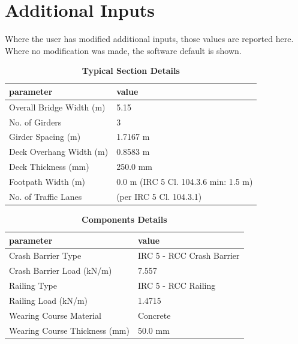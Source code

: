 \documentclass[12pt,a4paper]{report}
\numberwithin{table}{chapter}
\numberwithin{figure}{chapter}
\begin{document}
\newpage
\section{Additional Inputs}
\label{sec:additional-inputs}

Where the user has modified additional inputs, those values are reported here. Where no modification was made, the software default is shown.

\vspace{0.8cm}

\begin{longtable}{|L{5.5cm}|p{10.0cm}|}
\caption{\textbf{Typical Section Details}}
\hline
\textbf{parameter} & \textbf{value} \\
\hline
\textnormal{Overall Bridge Width (m)} & 5.15 \\[6pt]
\hline
\textnormal{No. of Girders} & 3 \\[6pt]
\hline
\textnormal{Girder Spacing (m)} & 1.7167 m \\[6pt]
\hline
\textnormal{Deck Overhang Width (m)} & 0.8583 m \\[6pt]
\hline
\textnormal{Deck Thickness (mm)} & 250.0 mm \\[6pt]
\hline
\textnormal{Footpath Width (m)} & 0.0 m (IRC 5 Cl. 104.3.6 min: 1.5 m) \\[6pt]
\hline
\textnormal{No. of Traffic Lanes} &  (per IRC 5 Cl. 104.3.1) \\[6pt]
\hline
\end{longtable}

\vspace{0.8em}

\begin{longtable}{|L{5.5cm}|p{10.0cm}|}
\caption{\textbf{Components Details}}
\hline
\textbf{parameter} & \textbf{value} \\
\hline
\textnormal{Crash Barrier Type} & IRC 5 - RCC Crash Barrier \\[6pt]
\hline
\textnormal{Crash Barrier Load (kN/m)} & 7.557 \\[6pt]
\hline

\textnormal{Railing Type} & IRC 5 - RCC Railing \\[6pt]
\hline
\textnormal{Railing Load (kN/m)} & 1.4715 \\[6pt]
\hline
\textnormal{Wearing Course Material} & Concrete \\[6pt]
\hline
\textnormal{Wearing Course Thickness (mm)} & 50.0 mm \\[6pt]
\hline
\end{longtable}
\end{document}
